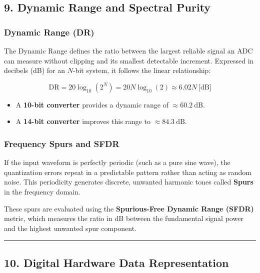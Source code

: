\documentclass[
]{article}
\providecommand{\tightlist}{%
  \setlength{\itemsep}{0pt}\setlength{\parskip}{0pt}}
\begin{document}
\subsection{9. Dynamic Range and Spectral
Purity}\label{dynamic-range-and-spectral-purity}

\subsubsection{Dynamic Range (DR)}\label{dynamic-range-dr}

The Dynamic Range defines the ratio between the largest reliable signal
an ADC can measure without clipping and its smallest detectable
increment. Expressed in decibels (dB) for an \(N\)-bit system, it
follows the linear relationship:

\[\text{DR} = 20 \log_{10}\left(2^N\right) = 20 N \log_{10}(2) \approx 6.02 N\ \text{[dB]}\]

\begin{itemize}
\tightlist
\item
  A \textbf{10-bit converter} provides a dynamic range of
  \(\approx 60.2\ \text{dB}\).
\item
  A \textbf{14-bit converter} improves this range to
  \(\approx 84.3\ \text{dB}\).
\end{itemize}

\subsubsection{Frequency Spurs and SFDR}\label{frequency-spurs-and-sfdr}

If the input waveform is perfectly periodic (such as a pure sine wave),
the quantization errors repeat in a predictable pattern rather than
acting as random noise. This periodicity generates discrete, unwanted
harmonic tones called \textbf{Spurs} in the frequency domain.

These spurs are evaluated using the \textbf{Spurious-Free Dynamic Range
(SFDR)} metric, which measures the ratio in dB between the fundamental
signal power and the highest unwanted spur component.

\begin{center}\rule{0.5\linewidth}{0.5pt}\end{center}

\subsection{10. Digital Hardware Data
Representation}\label{digital-hardware-data-representation}
\end{document}
